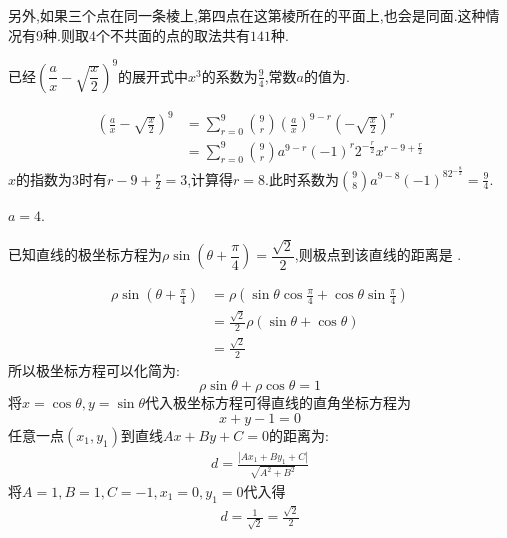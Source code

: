 \begin{questions}
\begin{solution}
\begin{enumerate}[label=\protect\circled{\arabic*}]
\begin{enumerate}[label=\Roman*]
\begin{center}
				            \end{center}
			      \end{enumerate}
		\end{enumerate}
		另外,如果三个点在同一条棱上,第四点在这第棱所在的平面上,也会是同面.这种情况有9种.则取$4$个不共面的点的取法共有$141$种.
	\end{solution}

	\question 已经$\left( \dfrac{a}{x} -\sqrt{\dfrac{x}{2}}
		\right)^9$的展开式中$x^3$的系数为$\frac94$,常数$a$的值为\fillin[36][2cm].

	\begin{solution}
		\begin{align*}
			\left( \frac{a}{x} - \sqrt{\frac{x}{2}} \right)^9
			 & = \sum_{r=0}^9\binom{9}{r} \left( \frac{a}{x} \right)^{9-r} \left( -\sqrt{\frac{x}{2}} \right)^r \\
			 & = \sum_{r=0}^{9}\binom{9}{r} a^{9-r}(-1)^r2^{-\frac{r}{2}}x^{r-9 + \frac{r}{2}}
		\end{align*}
		$x$的指数为$3$时有$r-9+\frac{r}{2} = 3$,计算得$r=8$.此时系数为$\binom{9}{8}a^{9-8}(-1)^82^{-\frac{8}{2}} = \frac94$.

		$a=4$.
	\end{solution}
	\question 已知直线的极坐标方程为$\rho\sin \left( \theta + \dfrac{\pi}{4} \right) =
		\dfrac{\sqrt{2}}{2}$,则极点到该直线的距离是 .

	\begin{solution}
		\begin{align*}
			\rho\sin \left( \theta + \frac{\pi}{4} \right)
			 & = \rho( \sin\theta\cos\frac{\pi}{4} + \cos\theta\sin\frac{\pi}{4}) \\
			 & =  \frac{\sqrt{2}}{2}\rho(\sin\theta + \cos\theta)                 \\
			 & = \frac{\sqrt{2}}{2}
		\end{align*}
		所以极坐标方程可以化简为:
		\begin{equation*}
			\rho\sin\theta + \rho\cos\theta = 1
		\end{equation*}
		将$x=\cos\theta, y=\sin\theta$代入极坐标方程可得直线的直角坐标方程为
		\begin{equation*}
			x + y - 1 = 0
		\end{equation*}
		任意一点$(x_1, y_1)$到直线$Ax+By+C=0$的距离为:
		\begin{align*}
			d = \frac{|Ax_1+By_1+C|}{\sqrt{A^2+B^2}}
		\end{align*}
		将$A=1,B=1,C=-1,x_1=0, y_1=0$代入得
		\begin{align*}
			d = \frac{1}{\sqrt{2}} = \frac{\sqrt{2}}{2}
		\end{align*}
	\end{solution}


\end{questions}
